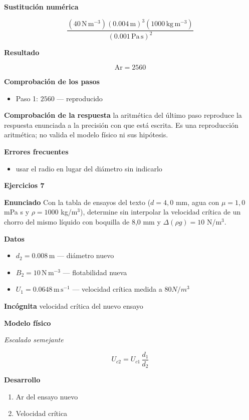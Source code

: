 \documentclass[10pt,openany]{book}
\begin{document}
\noindent\textbf{Sustitución numérica}

\[
\frac{\left(40\,\mathrm{N}\,\mathrm{m}^{-3}\right) \left(0.004\,\mathrm{m}\right)^{3} \left(1000\,\mathrm{kg}\,\mathrm{m}^{-3}\right)}{\left(0.001\,\mathrm{Pa}\,\mathrm{s}\right)^{2}}
\]

\noindent\textbf{Resultado}

\[
\mathrm{Ar} = 2560
\]

\noindent\textbf{Comprobación de los pasos}
\begin{itemize}
\item Paso 1: $2560$ — reproducido
\end{itemize}

\noindent\textbf{Comprobación de la respuesta} la aritmética del último paso reproduce la respuesta enunciada a la precisión con que está escrita. Es una reproducción aritmética; no valida el modelo físico ni sus hipótesis.

\noindent\textbf{Errores frecuentes}
\begin{itemize}
\item usar el radio en lugar del diámetro sin indicarlo
\end{itemize}

\noindent\textbf{Ejercicios 7}

\noindent\textbf{Enunciado}
Con la tabla de ensayos del texto (\(d = 4{,}0\) mm, agua con \(\mu = 1{,}0\) mPa s y \(\rho = 1000\) kg/m\(^3\)), determine sin interpolar la velocidad crítica de un chorro del mismo líquido con boquilla de 8,0 mm y \(\Delta(\rho g) = 10\) N/m\(^3\).

\noindent\textbf{Datos}
\begin{itemize}
\item $d_{2} = 0.008\,\mathrm{m}$ — diámetro nuevo
\item $B_{2} = 10\,\mathrm{N}\,\mathrm{m}^{-3}$ — flotabilidad nueva
\item $U_{1} = 0.0648\,\mathrm{m}\,\mathrm{s}^{-1}$ — velocidad crítica medida a \(80 N/m^3\)
\end{itemize}

\noindent\textbf{Incógnita}
velocidad crítica del nuevo ensayo

\noindent\textbf{Modelo físico}

\noindent\textit{Escalado semejante}

\[
U_{c2} = U_{c1}\,\frac{d_1}{d_2}
\]

\noindent\textbf{Desarrollo}
\begin{enumerate}
\item
Ar del ensayo nuevo
\item
Velocidad crítica
\end{enumerate}
\end{document}
